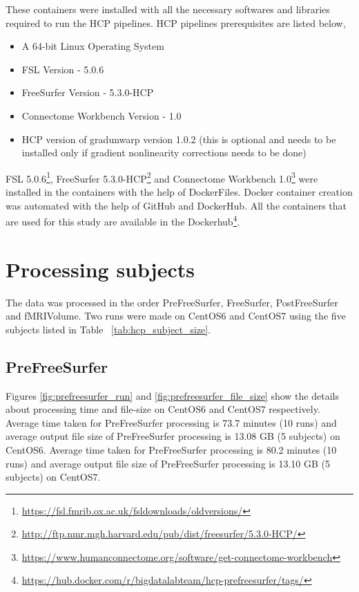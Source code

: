 These containers were installed with all the necessary softwares and libraries required to run the HCP pipelines. HCP pipelines prerequisites are listed below,

\begin{itemize}
\item A 64-bit Linux Operating System
\item FSL Version - 5.0.6
\item FreeSurfer Version - 5.3.0-HCP
\item Connectome Workbench Version - 1.0 
\item HCP version of gradunwarp version 1.0.2 (this is optional and needs to be installed only if gradient nonlinearity corrections needs to be done)
\end{itemize}

FSL 5.0.6\footnote{\url{https://fsl.fmrib.ox.ac.uk/fsldownloads/oldversions/}}, FreeSurfer 5.3.0-HCP\footnote{\url{http://ftp.nmr.mgh.harvard.edu/pub/dist/freesurfer/5.3.0-HCP/}} and Connectome Workbench 1.0\footnote{\url{https://www.humanconnectome.org/software/get-connectome-workbench}} were installed in the containers with the help of DockerFiles.
Docker container creation was automated with the help of GitHub and DockerHub. All the containers that are used for this study are available in the Dockerhub\footnote{\url{https://hub.docker.com/r/bigdatalabteam/hcp-prefreesurfer/tags/}}.

\section{Processing subjects}
The data was processed in the order PreFreeSurfer, FreeSurfer, PostFreeSurfer and fMRIVolume. Two runs were made on CentOS6 and CentOS7 using the five subjects listed in Table ~\ref{tab:hcp_subject_size}.
\subsection{PreFreeSurfer}
Figures \ref{fig:prefreesurfer_run} and \ref{fig:prefreesurfer_file_size} show the details about processing time and file-size on CentOS6 and CentOS7 respectively.
Average time taken for PreFreeSurfer processing is 73.7 minutes (10 runs) and average output file size of PreFreeSurfer processing is 13.08 GB (5 subjects) on CentOS6.
Average time taken for PreFreeSurfer processing is 80.2 minutes (10 runs) and average output file size of PreFreeSurfer processing is 13.10 GB (5 subjects) on CentOS7.

